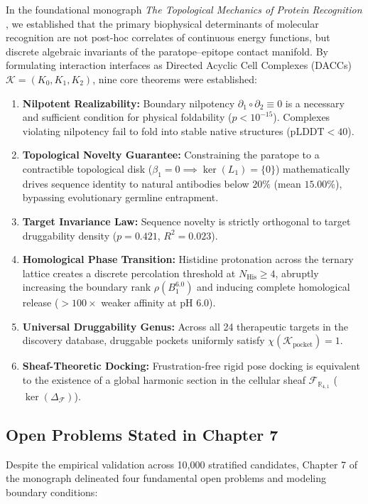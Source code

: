 \documentclass[11pt, a4paper]{article}
\theoremstyle{definition}
\theoremstyle{plain}
\theoremstyle{remark}
\newcommand{\CGA}{\mathbb{R}_{4,1}}
\begin{document}
In the foundational monograph \textit{The Topological Mechanics of Protein Recognition} \cite{ouladbrahim2026topological}, we established that the primary biophysical determinants of molecular recognition are not post-hoc correlates of continuous energy functions, but discrete algebraic invariants of the paratope--epitope contact manifold. By formulating interaction interfaces as Directed Acyclic Cell Complexes (DACCs) $\mathcal{K} = (K_0, K_1, K_2)$, nine core theorems were established:
\begin{enumerate}[label=\textbf{T\arabic*.}]
    \item \textbf{Nilpotent Realizability:} Boundary nilpotency $\partial_1 \circ \partial_2 \equiv 0$ is a necessary and sufficient condition for physical foldability ($p < 10^{-15}$). Complexes violating nilpotency fail to fold into stable native structures ($\text{pLDDT} < 40$).
    \item \textbf{Topological Novelty Guarantee:} Constraining the paratope to a contractible topological disk ($\beta_1 = 0 \implies \ker(L_1) = \{0\}$) mathematically drives sequence identity to natural antibodies below $20\%$ (mean $15.00\%$), bypassing evolutionary germline entrapment.
    \item \textbf{Target Invariance Law:} Sequence novelty is strictly orthogonal to target druggability density ($p = 0.421$, $R^2 = 0.023$).
    \item \textbf{Homological Phase Transition:} Histidine protonation across the ternary lattice creates a discrete percolation threshold at $N_{\text{His}} \ge 4$, abruptly increasing the boundary rank $\rho(B_1^{6.0})$ and inducing complete homological release ($>100\times$ weaker affinity at pH 6.0).
    \item \textbf{Universal Druggability Genus:} Across all 24 therapeutic targets in the discovery database, druggable pockets uniformly satisfy $\chi(\mathcal{K}_{\text{pocket}}) = 1$.
    \item \textbf{Sheaf-Theoretic Docking:} Frustration-free rigid pose docking is equivalent to the existence of a global harmonic section in the cellular sheaf $\mathcal{F}_{\CGA}$ ($\ker(\Delta_{\mathcal{F}})$).
\end{enumerate}

\subsection{Open Problems Stated in Chapter 7}
Despite the empirical validation across 10,000 stratified candidates, Chapter 7 of the monograph delineated four fundamental open problems and modeling boundary conditions:
\end{document}
